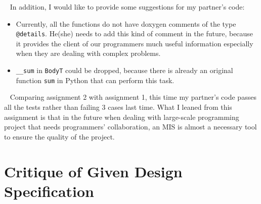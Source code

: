 \documentclass[12pt]{article}
\begin{document}
~\newline\noindent
In addition, I would like to provide some  suggestions for my partner's code:
\begin{itemize}
\item Currently, all the functions do not have doxygen comments of the type \verb|@details|. He(she) needs to add this kind of comment in the future, because it provides the client of our programmers much useful information especially when they are dealing with complex problems.
\item \verb|__sum| in \verb|BodyT| could be dropped, because there is already an original function \verb|sum| in Python that can perform this task.
\end{itemize}

~\newline\noindent
Comparing assignment 2 with assignment 1, this time my partner's code passes all the tests rather than failing 3 cases last time. What I leaned from this assignment is that in the future when dealing with large-scale programming project that needs programmers' collaboration, an MIS is almost a necessary tool to ensure the quality of the project.

\section{Critique of Given Design Specification}
\end{document}
